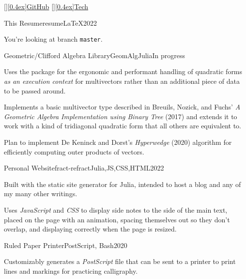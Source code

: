\projectheader
   {}%
   {\normalfont\underline{\raisebox{0pt}[\height][0.4ex]{GitHub}}}%
   {\normalfont\underline{\raisebox{0pt}[\height][0.4ex]{Tech}}}%
   {}
\vspace{1ex}

\begin{project}{This Resume}{resume}\LaTeX{2022}
    \item You're looking at branch \texttt{master}.
\end{project}

\begin{project}{Geometric/Clifford Algebra Library}{GeomAlg}{Julia}{In progress}
    \item Uses the  package
        for the ergonomic and performant handling of quadratic forms
        \textit{as an execution context} for multivectors
        rather than an additional piece of data to be passed around.
    \item Implements a basic multivector type
        described in Breuils, Nozick, and Fuchs'
        \textit{A Geometric Algebra Implementation using Binary Tree} (2017)
        and extends it to work with a kind of tridiagonal quadratic form
        that all others are equivalent to.
    \item Plan to implement De Keninck and Dorst's
        \textit{Hyperwedge} (2020) algorithm
        for efficiently computing outer products of vectors.
\end{project}

\begin{project}{Personal Website}{fract-refract}{Julia,JS,CSS,HTML}{2022}
    \item Built with the  static site generator for Julia,
        intended to host a blog and any of my many other writings.
    \item Uses \emph{JavaScript} and \emph{CSS}
        to display side notes to the side of the main text,
        placed on the page with an animation,
        spacing themselves out so they don't overlap,
        and displaying correctly when the page is resized.
\end{project}

\begin{project}{Ruled Paper Printer}{}{PostScript, Bash}{2020}
    \item Customizably generates a \emph{PostScript} file
        that can be sent to a printer to print lines and markings
        for practicing calligraphy.
\end{project}

